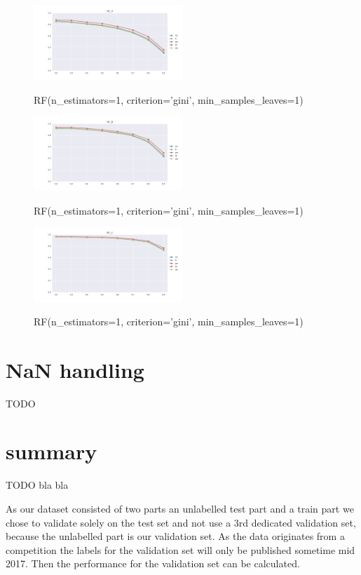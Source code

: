 \documentclass{sig-alternate-05-2015}
\begin{document}
\begin{figure}[]
  \centering
  \caption{RF(n\_estimators=1, criterion='gini', min\_samples\_leaves=1)}
  \includegraphics[width=0.5\textwidth]{../plots/RF_A}
  \label{fig:anomalySetup}
\end{figure}

\begin{figure}[]
  \centering
  \caption{RF(n\_estimators=1, criterion='gini', min\_samples\_leaves=1)}
  \includegraphics[width=0.5\textwidth]{../plots/RF_B}
  \label{fig:anomalySetup}
\end{figure}

\begin{figure}[]
  \centering
  \caption{RF(n\_estimators=1, criterion='gini', min\_samples\_leaves=1)}
  \includegraphics[width=0.5\textwidth]{../plots/RF_C}
  \label{fig:anomalySetup}
\end{figure}



\section{NaN handling}

TODO

\section{summary}

TODO bla bla

As our dataset consisted of two parts an unlabelled test part and a train part we chose to validate solely on the test set and not use a 3rd dedicated validation set, because the unlabelled part is our validation set. As the data originates from a competition the labels for the validation set will only be published sometime mid 2017. Then the performance for the validation set can be calculated.
\end{document}

